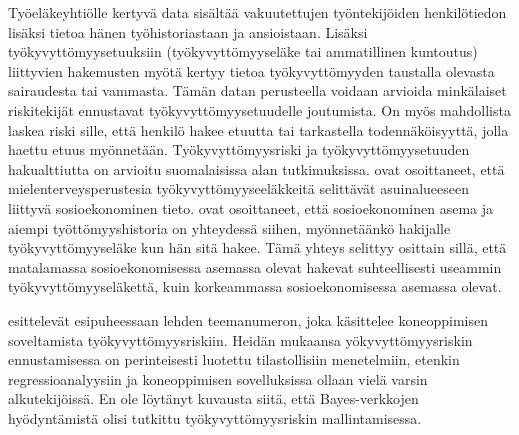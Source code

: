 Työeläkeyhtiölle kertyvä data sisältää vakuutettujen työntekijöiden henkilötiedon lisäksi tietoa hänen työhistoriastaan ja ansioistaan. Lisäksi työkyvyttömyysetuuksiin (työkyvyttömyyseläke tai ammatillinen kuntoutus) liittyvien hakemusten myötä kertyy tietoa työkyvyttömyyden taustalla olevasta sairaudesta tai vammasta. Tämän datan perusteella voidaan arvioida minkälaiset riskitekijät ennustavat työkyvyttömyysetuudelle joutumista. On myös mahdollista laskea riski sille, että henkilö hakee etuutta tai tarkastella todennäköisyyttä, jolla haettu etuus myönnetään. Työkyvyttömyysriski ja työkyvyttömyysetuuden hakualttiutta on arvioitu suomalaisissa alan tutkimuksissa. \citet{karolaakso_contextual_2021, karolaakso_socioeconomic_2020} ovat osoittaneet, että mielenterveysperustesia työkyvyttömyyseeläkkeitä selittävät asuinalueeseen liittyvä sosioekonominen tieto. \citet{perhoniemi_determinants_2020, perhoniemi_tyokyvyttomyyselakehakemusten_2020} ovat osoittaneet, että sosioekonominen asema ja aiempi työttömyyshistoria on yhteydessä siihen, myönnetäänkö hakijalle työkyvyttömyyseläke kun hän sitä hakee. Tämä yhteys selittyy osittain sillä, että matalamassa sosioekonomisessa asemassa olevat hakevat suhteellisesti useammin työkyvyttömyyseläkettä, kuin korkeammassa sosioekonomisessa asemassa olevat.

\citet{gross_machine_2020} esittelevät esipuheessaan lehden teemanumeron, joka käsittelee koneoppimisen soveltamista työkyvyttömyysriskiin. Heidän mukaansa yökyvyttömyysriskin ennustamisessa on perinteisesti luotettu tilastollisiin menetelmiin, etenkin regressioanalyysiin ja koneoppimisen sovelluksissa ollaan vielä varsin alkutekijöissä. En ole löytänyt kuvausta siitä, että Bayes-verkkojen hyödyntämistä olisi tutkittu työkyvyttömyysriskin mallintamisessa. 

